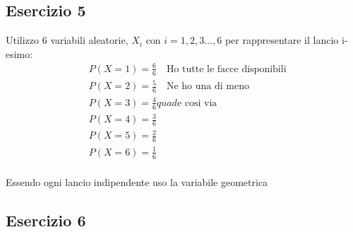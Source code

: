 \documentclass[12pt]{article}
\begin{document}
\subsection*{Esercizio 5}
Utilizzo 6 variabili aleatorie, \(X_i\) con \(i = 1,2,3\dots, 6\) per rappresentare il lancio i-esimo:
\begin{align*}
    &P(X = 1) = \frac{6}{6} \quad \text{Ho tutte le facce disponibili} \\
    &P(X = 2) = \frac{5}{6} \quad \text{Ne ho una di meno}\\
    &P(X = 3) = \frac{4}{6} quad \text{e cosi via}\\
    &P(X = 4) = \frac{3}{6} \\
    &P(X = 5) = \frac{2}{6}\\
    &P(X = 6) = \frac{1}{6}\\
\end{align*}

Essendo ogni lancio indipendente uso la variabile geometrica 
\subsection*{Esercizio 6}
\end{document}
